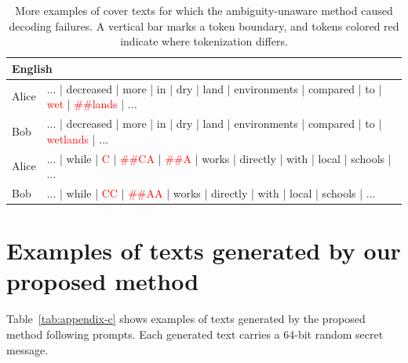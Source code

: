 \documentclass[11pt]{article}
\begin{document}
\begin{table}[t]
\begin{tabular}{l|l}
\hline
\hline
\multicolumn{2}{l}{English} \\
\hline
Alice & ... |  decreased | more | in | dry | land | environments | compared | to | \textcolor{red}{wet} | \textcolor{red}{\#\#lands} | ... \\
Bob & ... | decreased | more | in | dry | land | environments | compared | to | \textcolor{red}{wetlands} | ... \\
\hline
Alice & ... | while | \textcolor{red}{C} | \textcolor{red}{\#\#CA} | \textcolor{red}{\#\#A} | works | directly | with | local | schools | ... \\
Bob & ... | while | \textcolor{red}{CC} | \textcolor{red}{\#\#AA} | works | directly | with | local | schools | ... \\
\hline
\end{tabular}
\caption{More examples of cover texts for which the ambiguity-unaware method caused decoding failures.
A vertical bar marks a token boundary, and tokens colored red indicate where tokenization differs.}
\label{tab:appendix-b}
\end{table}

\section{Examples of texts generated by our proposed method} \label{sec:appendix-c}
Table~\ref{tab:appendix-c} shows examples of texts generated by the proposed method following prompts.
Each generated text carries a 64-bit random secret message.
\end{document}

